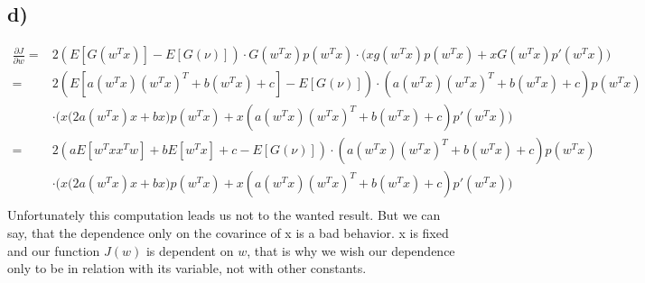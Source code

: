 \documentclass[paper=a4,fontsize=10pt,DIV11,BCOR10mm]{scrartcl}
\begin{document}
\subsection*{d)}
\begin{align*}
\frac{\partial J}{\partial w} =& 2(E[G(w^Tx)] - E[G(\nu)]) \cdot G(w^Tx)p(w^Tx) \cdot \big( xg(w^Tx) p(w^Tx) + xG(w^Tx)p'(w^Tx)\big) \\
=& 2(E[a(w^Tx)(w^Tx)^T + b(w^Tx) + c] - E[G(\nu)]) \cdot (a(w^Tx)(w^Tx)^T + b(w^Tx) + c)p(w^Tx)\\&
 \cdot \bigg( x\big(2a(w^Tx)x + bx\big) p(w^Tx) + x(a(w^Tx)(w^Tx)^T + b(w^Tx) + c)p'(w^Tx)\bigg) \\
=& 2(aE[w^Txx^Tw] + bE[w^Tx] + c - E[G(\nu)]) \cdot (a(w^Tx)(w^Tx)^T + b(w^Tx) + c)p(w^Tx)\\&
 \cdot \bigg( x\big(2a(w^Tx)x + bx\big) p(w^Tx) + x(a(w^Tx)(w^Tx)^T + b(w^Tx) + c)p'(w^Tx)\bigg) \\
\end{align*}
Unfortunately this computation leads us not to the wanted result. But we can say, that the dependence only on the covarince of x is a bad behavior. x is fixed and our function $J(w)$ is dependent on $w$, that is why we wish our dependence only to be in relation with its variable, not with other constants.



\end{document}
